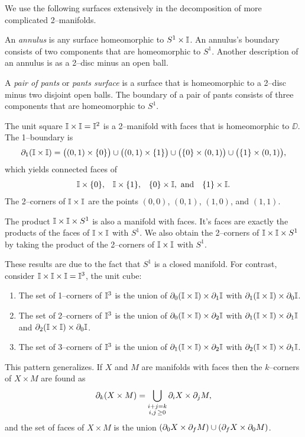 We use the following surfaces extensively in the decomposition of more complicated 2--manifolds.

\begin{defn}
	\label{def:annulus}
	An \emph{annulus} is any surface homeomorphic to $S^1\times\mathbb{I}$.
	An annulus's boundary consists of two components that are homeomorphic to $S^1$.
	Another description of an annulus is as a 2--disc minus an open ball.
\end{defn}

\begin{defn}
	\label{def:pants}
	A \emph{pair of pants} or \emph{pants surface} is a surface that is homeomorphic to a 2--disc minus two disjoint open balls.
	The boundary of a pair of pants consists of three components that are homeomorphic to $S^1$.
\end{defn}

\begin{ex}
	The unit square $\mathbb{I}\times \mathbb{I}=\mathbb{I}^2$ is a 2--manifold with faces that is homeomorphic to $\DD$.
	The 1--boundary is 
	\[\partial_1(\mathbb{I}\times\mathbb{I}) = \big((0,1)\times\{0\}\big)\cup\big((0,1)\times\{1\}\big)\cup\big(\{0\}\times(0,1)\big)\cup\big(\{1\}\times(0,1)\big),\]
	which yields connected faces of
	\[
		\begin{array}{cccc}
			\mathbb{I}\times\{0\}, & \mathbb{I}\times\{1\}, & \{0\}\times\mathbb{I}, \textmd{ and}&\{1\}\times\mathbb{I}.
		\end{array}
	\]
	The 2--corners of $\mathbb{I}\times\mathbb{I}$ are the points $(0,0)$, $(0,1)$, $(1,0)$, and $(1,1)$.

	The product $\mathbb{I}\times\mathbb{I}\times S^1$ is also a manifold with faces.
	It's faces are exactly the products of the faces of $\mathbb{I}\times\mathbb{I}$ with $S^1$.
	We also obtain the 2--corners of $\mathbb{I}\times\mathbb{I}\times S^1$ by taking the product of the 2--corners of $\mathbb{I}\times\mathbb{I}$ with $S^1$.
	
	These results are due to the fact that $S^1$ is a closed manifold.
	For contrast, consider $\mathbb{I}\times\mathbb{I}\times\mathbb{I}=\mathbb{I}^3$, the unit cube:
	\begin{enumerate}
		\item The set of 1--corners of $\mathbb{I}^3$ is the union of $\partial_0(\mathbb{I}\times\mathbb{I})\times\partial_1\mathbb{I}$ with $\partial_1(\mathbb{I}\times\mathbb{I})\times\partial_0\mathbb{I}$.
		\item The set of 2--corners of $\mathbb{I}^3$ is the union of $\partial_0(\mathbb{I}\times\mathbb{I})\times\partial_2\mathbb{I}$ with $\partial_1(\mathbb{I}\times\mathbb{I})\times\partial_1\mathbb{I}$ and $\partial_2(\mathbb{I}\times\mathbb{I})\times\partial_0\mathbb{I}$.
		\item The set of 3--corners of $\mathbb{I}^3$ is the union of $\partial_1(\mathbb{I}\times\mathbb{I})\times\partial_2\mathbb{I}$ with $\partial_2(\mathbb{I}\times\mathbb{I})\times\partial_1\mathbb{I}$.
	\end{enumerate}	
	This pattern generalizes.
	If $X$ and $M$ are manifolds with faces then the $k$--corners of $X\times M$ are found as
	\[
		\partial_k(X\times M) = \bigcup_{\substack{i+j=k\\i,j\,\geq0}} \partial_i X\times \partial_j M,
	\]
	and the set of faces of $X\times M$ is the union $(\partial_0 X\times\partial_f M)\cup(\partial_f X\times\partial_0 M)$.
\end{ex}


